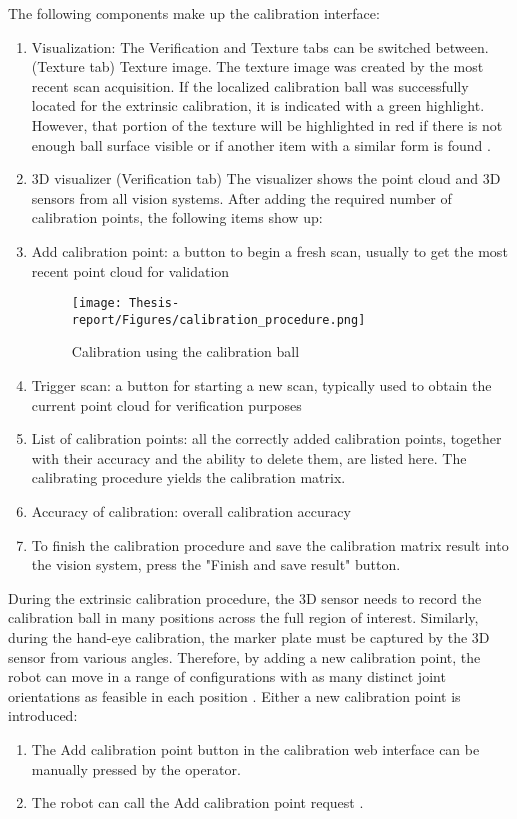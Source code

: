 \documentclass[12pt]{article}
\begin{document}
The following components make up the calibration interface:
\begin{enumerate}
    \item   Visualization: The Verification and Texture tabs can be switched between.
 (Texture tab) Texture image. The texture image was created by the most recent scan acquisition. If the localized calibration ball was successfully located for the extrinsic calibration, it is indicated with a green highlight. However, that portion of the texture will be highlighted in red if there is not enough ball surface visible or if another item with a similar form is found \cite{ref2}.
 \item   3D visualizer (Verification tab) 
The visualizer shows the point cloud and 3D sensors from all vision systems.
 After adding the required number of calibration points, the following items show up: \cite{ref2}
\item  Add calibration point: a button to begin a fresh scan, usually to get the most recent point cloud for validation \cite{ref2}
\begin{figure}[h]
    \centering
    \texttt{[image: Thesis-report/Figures/calibration\_procedure.png]}
    \caption{Calibration using the calibration ball \cite{ref2} }
    \label{fig:Photoneo Cmaera}
\end{figure} 

\item   Trigger scan: a button for starting a new scan, typically used to obtain the current point cloud for verification purposes 
\item  List of calibration points: all the correctly added calibration points, together with their accuracy and the ability to delete them, are listed here.  The calibrating procedure yields the calibration matrix.
\item   Accuracy of calibration: overall calibration accuracy 
\item  To finish the calibration procedure and save the calibration matrix result into the vision system, press the "Finish and save result" button.
\end{enumerate}

During the extrinsic calibration procedure, the 3D sensor needs to record the calibration ball in many positions across the full region of interest. Similarly, during the hand-eye calibration, the marker plate must be captured by the 3D sensor from various angles.  Therefore, by adding a new calibration point, the robot can move in a range of configurations with as many distinct joint orientations as feasible in each position \cite{ref2}.
\newpage
Either a new calibration point is introduced:
\begin{enumerate}
    \item The Add calibration point button in the calibration web interface can be manually pressed by the operator\cite{ref2}.
    \item The robot can call the Add calibration point request \cite{ref2}.
\end{enumerate}
\end{document}

